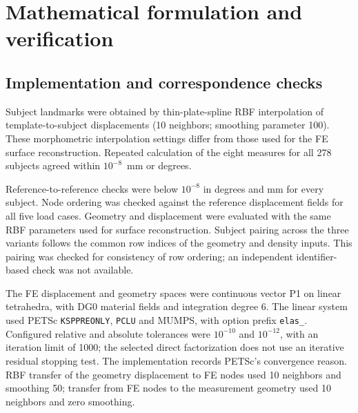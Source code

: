 \appendix
\section{Mathematical formulation and verification}
\label{app:mathematical_formulation}

\subsection{Implementation and correspondence checks}
\label{app:implementation_checks}
Subject landmarks were obtained by thin-plate-spline RBF interpolation of template-to-subject displacements (10 neighbors; smoothing parameter 100). These morphometric interpolation settings differ from those used for the FE surface reconstruction. Repeated calculation of the eight measures for all 278 subjects agreed within $10^{-8}$~mm or degrees.

Reference-to-reference checks were below $10^{-8}$ in degrees and mm for every subject. Node ordering was checked against the reference displacement fields for all five load cases. Geometry and displacement were evaluated with the same RBF parameters used for surface reconstruction. Subject pairing across the three variants follows the common row indices of the geometry and density inputs. This pairing was checked for consistency of row ordering; an independent identifier-based check was not available.

The FE displacement and geometry spaces were continuous vector P1 on linear tetrahedra, with DG0 material fields and integration degree 6. The linear system used PETSc \texttt{KSPPREONLY}, \texttt{PCLU} and MUMPS, with option prefix \texttt{elas\_}. Configured relative and absolute tolerances were $10^{-10}$ and $10^{-12}$, with an iteration limit of 1000; the selected direct factorization does not use an iterative residual stopping test. The implementation records PETSc's convergence reason. RBF transfer of the geometry displacement to FE nodes used 10 neighbors and smoothing 50; transfer from FE nodes to the measurement geometry used 10 neighbors and zero smoothing.

